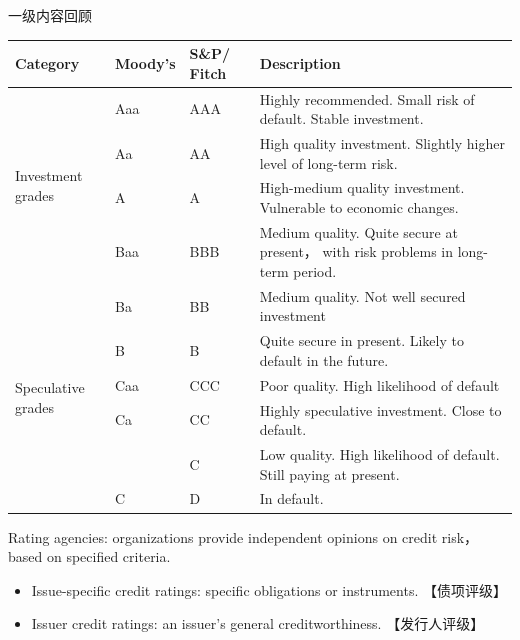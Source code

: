 \begin{itemize}
\begin{knowledgebox}{一级内容回顾}
        \begin{center}
            {\renewcommand{\arraystretch}{1.5}  %
            \begin{tabular}{|l|l|l|p{7cm}|}  %
            \hline
            \textbf{Category} & \textbf{Moody's} & \textbf{S\&P/ Fitch} & \textbf{Description} \\
            \hline
            \multirow{4}{*}{Investment grades} & Aaa & AAA & Highly recommended. Small risk of default. Stable investment. \\
            \cline{2-4}
            & Aa & AA & High quality investment. Slightly higher level of long-term risk. \\
            \cline{2-4}
            & A & A & High-medium quality investment. Vulnerable to economic changes. \\
            \cline{2-4}
            & Baa & BBB & Medium quality. Quite secure at present， with risk problems in long-term period. \\
            \hline
            \multirow{7}{*}{Speculative grades} & Ba & BB & Medium quality. Not well secured investment \\
            \cline{2-4}
            & B & B & Quite secure in present. Likely to default in the future. \\
            \cline{2-4}
            & Caa & CCC & Poor quality. High likelihood of default \\
            \cline{2-4}
            & Ca & CC & Highly speculative investment. Close to default. \\
            \cline{2-4}
            & & C & Low quality. High likelihood of default. Still paying at present. \\
            \cline{2-4}
            & C & D & In default. \\
            \hline
            \end{tabular}}
            \end{center}



    Rating agencies: organizations provide independent opinions on credit risk， based on specified criteria.

        \begin{itemize}
        \item Issue-specific credit ratings: specific obligations or instruments. 【债项评级】
        \item Issuer credit ratings: an issuer's general creditworthiness. 【发行人评级】
        \end{itemize}


\end{knowledgebox}
\end{itemize}
